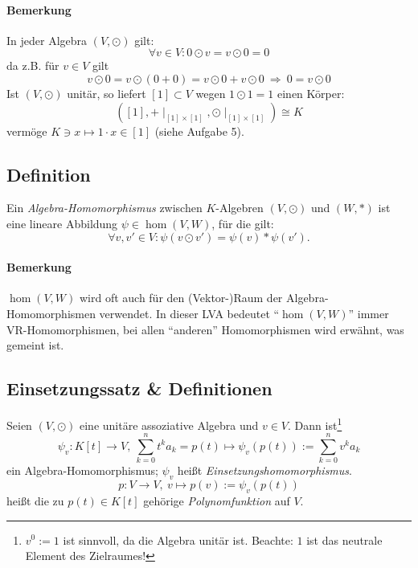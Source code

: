 \paragraph{Bemerkung}
	In jeder Algebra $ (V,\odot) $ gilt:
		\[ \forall v\in V: 0\odot v = v\odot 0 = 0 \]
	da z.B. für $ v\in V $ gilt
		\[ v\odot 0 = v\odot (0+0) = v\odot 0 + v\odot 0 \ \Rightarrow\  0=v\odot 0\]
	Ist $ (V,\odot) $ unitär, so liefert $ [1]\subset V $ wegen $ 1\odot 1 = 1 $ einen Körper:
		\[ ([1], +\mid_{[1]\times [1]},\odot\mid_{[1]\times [1]} ) \cong K \]
	vermöge $ K\ni x \mapsto 1 \cdot x\in [1] $ (siehe Aufgabe 5).
	
\subsection{Definition}
	\begin{Definition}
		Ein \emph{Algebra-Homomorphismus} zwischen $ K $-Algebren $ (V,\odot) $ und $ (W,*) $ ist eine lineare Abbildung $ \psi\in \hom(V,W) $, für die gilt:
		\[ \forall v,v' \in V: \psi(v\odot v')=\psi(v)*\psi(v'). \]
	\end{Definition}
\paragraph{Bemerkung}
	$ \hom(V,W) $ wird oft auch für den (Vektor-)Raum der Algebra-Homomorphismen verwendet. In dieser LVA bedeutet "`$ \hom(V,W) $"' immer VR-Homomorphismen, bei allen "`anderen"' Homomorphismen wird  erwähnt, was gemeint ist.


\subsection{Einsetzungssatz \& Definitionen}
	\begin{Satz}[Einsetzungssatz]
		Seien $ (V,\odot) $ eine unitäre assoziative Algebra und $ v\in V $. Dann ist\footnote{$ v^0 := 1 $ ist sinnvoll, da die Algebra unitär ist. Beachte: $1$ ist das neutrale Element des Zielraumes!}
			\[ \psi_v: K[t]\to V,\ \sum_{k=0}^{n}t^ka_k = p(t)\mapsto \psi_v(p(t)) := \sum_{k=0}^{n}v^ka_k \]
		ein Algebra-Homomorphismus; $ \psi_v $ heißt \emph{Einsetzungshomomorphismus}. 
			\[ p:V\to V,\ v\mapsto p(v) := \psi_v(p(t)) \]
		heißt die zu $ p(t)\in K[t] $ gehörige \emph{Polynomfunktion} auf $ V $.
	\end{Satz}
